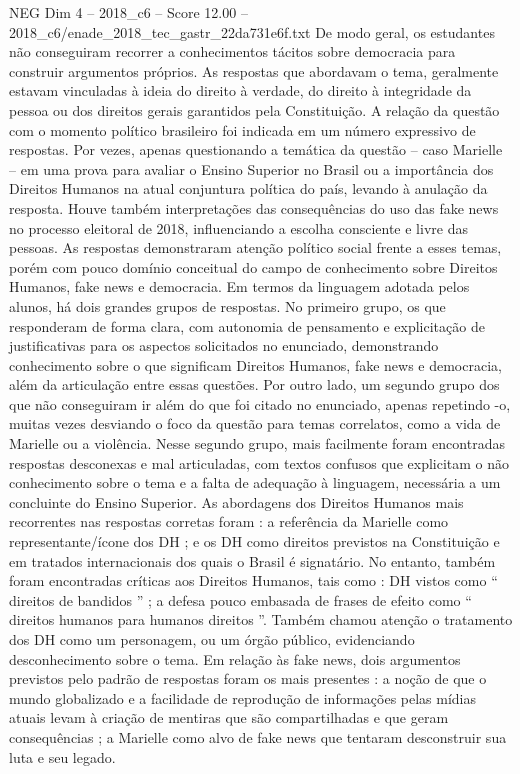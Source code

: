 \begin{textsample}{NEG Dim 4 – 2018\_c6 – Score 12.00 – 2018\_c6/enade\_2018\_tec\_gastr\_22da731e6f.txt}
De modo geral, os estudantes não conseguiram recorrer a conhecimentos tácitos sobre democracia para construir argumentos próprios.
As respostas que abordavam o tema, geralmente estavam vinculadas à ideia do direito à verdade, do direito à integridade da pessoa ou dos direitos gerais garantidos pela Constituição.
A relação da questão com o momento político brasileiro foi indicada em um número expressivo de respostas.
Por vezes, apenas questionando a temática da questão – caso Marielle – em uma prova para avaliar o Ensino Superior no Brasil ou a importância dos Direitos Humanos na atual conjuntura política do país, levando à anulação da resposta.
Houve também interpretações das consequências do uso das fake news no processo eleitoral de 2018, influenciando a escolha consciente e livre das pessoas.
As respostas demonstraram atenção político social frente a esses temas, porém com pouco domínio conceitual do campo de conhecimento sobre Direitos Humanos, fake news e democracia.
Em termos da linguagem adotada pelos alunos, há dois grandes grupos de respostas.
No primeiro grupo, os que responderam de forma clara, com autonomia de pensamento e explicitação de justificativas para os aspectos solicitados no enunciado, demonstrando conhecimento sobre o que significam Direitos Humanos, fake news e democracia, além da articulação entre essas questões.
Por outro lado, um segundo grupo dos que não conseguiram ir além do que foi citado no enunciado, apenas repetindo -o, muitas vezes desviando o foco da questão para temas correlatos, como a vida de Marielle ou a violência.
Nesse segundo grupo, mais facilmente foram encontradas respostas desconexas e mal articuladas, com textos confusos que explicitam o não conhecimento sobre o tema e a falta de adequação à linguagem, necessária a um concluinte do Ensino Superior.
As abordagens dos Direitos Humanos mais recorrentes nas respostas corretas foram : a referência da Marielle como representante/ícone dos DH ; e os DH como direitos previstos na Constituição e em tratados internacionais dos quais o Brasil é signatário.
No entanto, também foram encontradas críticas aos Direitos Humanos, tais como : DH vistos como “ direitos de bandidos ” ; a defesa pouco embasada de frases de efeito como “ direitos humanos para humanos direitos ”.
Também chamou atenção o tratamento dos DH como um personagem, ou um órgão público, evidenciando desconhecimento sobre o tema.
Em relação às fake news, dois argumentos previstos pelo padrão de respostas foram os mais presentes : a noção de que o mundo globalizado e a facilidade de reprodução de informações pelas mídias atuais levam à criação de mentiras que são compartilhadas e que geram consequências ; a Marielle como alvo de fake news que tentaram desconstruir sua luta e seu legado.

\end{textsample}
